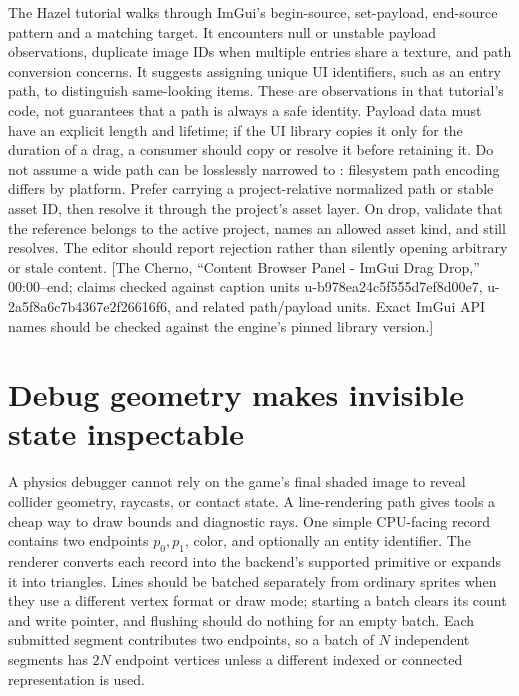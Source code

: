 The Hazel tutorial walks through ImGui's begin-source, set-payload, end-source pattern and a matching target. It encounters null or unstable payload observations, duplicate image IDs when multiple entries share a texture, and path conversion concerns. It suggests assigning unique UI identifiers, such as an entry path, to distinguish same-looking items. These are observations in that tutorial's code, not guarantees that a path is always a safe identity. Payload data must have an explicit length and lifetime; if the UI library copies it only for the duration of a drag, a consumer should copy or resolve it before retaining it. Do not assume a wide path can be losslessly narrowed to : filesystem path encoding differs by platform. Prefer carrying a project-relative normalized path or stable asset ID, then resolve it through the project's asset layer. On drop, validate that the reference belongs to the active project, names an allowed asset kind, and still resolves. The editor should report rejection rather than silently opening arbitrary or stale content. {[}The Cherno, ``Content Browser Panel - ImGui Drag Drop,'' 00:00--end; claims checked against caption units u-b978ea24c5f555d7ef8d00e7, u-2a5f8a6c7b4367e2f26616f6, and related path/payload units. Exact ImGui API names should be checked against the engine's pinned library version.{]}

\section{Debug geometry makes invisible state inspectable}\label{06-engine-ii-ch047-debug-geometry-makes-invisible-state-inspectable}

\hypertarget{06-engine-ii-ch047-debug-geometry-makes-invisible-state-inspectable}{}

A physics debugger cannot rely on the game's final shaded image to reveal collider geometry, raycasts, or contact state. A line-rendering path gives tools a cheap way to draw bounds and diagnostic rays. One simple CPU-facing record contains two endpoints \(p_0,p_1\), color, and optionally an entity identifier. The renderer converts each record into the backend's supported primitive or expands it into triangles. Lines should be batched separately from ordinary sprites when they use a different vertex format or draw mode; starting a batch clears its count and write pointer, and flushing should do nothing for an empty batch. Each submitted segment contributes two endpoints, so a batch of \(N\) independent segments has \(2N\) endpoint vertices unless a different indexed or connected representation is used.

